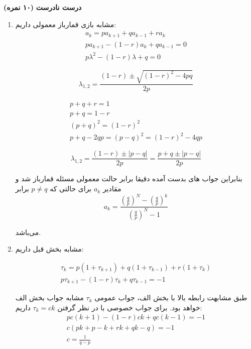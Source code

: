 \Large \textbf{درست نادرست}
\large \textbf{(۱۰ نمره)}

\normalsize \vspace{0.5cm}

\begin{enumerate}[label=(\alph*)]
	\item
	مشابه بازی قمارباز معمولی داریم:
	$$
	\begin{array}{c}
		{a_k} = p{a_{k + 1}} + q{a_{k - 1}} + r{a_k}\\
		p{a_{k + 1}} - \left( {1 - r} \right){a_k} + q{a_{k - 1}} = 0\\
		p{\lambda ^2} - \left( {1 - r} \right)\lambda  + q = 0
	\end{array}
	$$
	
	$$
	{\lambda _{1,2}} = \frac{{\left( {1 - r} \right) \pm \sqrt {{{\left( {1 - r} \right)}^2} - 4pq} }}{{2p}}
	$$
	
	$$
	\begin{array}{c}
		p + q + r = 1\\
		p + q = 1 - r\\
		{\left( {p + q} \right)^2} = {\left( {1 - r} \right)^2}\\
		p + q - 2qp = {\left( {p - q} \right)^2} = {\left( {1 - r} \right)^2} - 4qp
	\end{array}
	$$
	
	$$
	{\lambda _{1,2}} = \frac{{\left( {1 - r} \right) \pm \left| {p - q} \right|}}{{2p}} = \frac{{p + q \pm \left| {p - q} \right|}}{{2p}}
	$$
	
	بنابراین جواب های بدست آمده دقیقا برابر حالت معمولی مسئله قمارباز شد و مقادیر
	${a_k}$
	برای حالتی که
	$p \ne q$
	برابر
	$$
	{a_k} = \frac{{{{\left( {\frac{q}{p}} \right)}^N} - {{\left( {\frac{q}{p}} \right)}^k}}}{{{{\left( {\frac{q}{p}} \right)}^N} - 1}}
	$$
	
	می‌باشد.
	
	\item
	
	مشابه بخش قبل داریم:
	
	$$
	\begin{array}{c}
		{\tau _k} = p\left( {1 + {\tau _{k + 1}}} \right) + q\left( {1 + {\tau _{k - 1}}} \right) + r\left( {1 + {\tau _k}} \right)\\
		p{\tau _{k + 1}} - \left( {1 - r} \right){\tau _k} + q{\tau _{k - 1}} =  - 1
	\end{array}
	$$
	
	طبق مشابهت رابطه بالا با بخش الف،‌ جواب عمومی
	${\tau _k}$
	مشابه جواب بخش الف خواهد بود. برای جواب خصوصی با در نظر گرفتن
	${\tau _k} = ck$
	داریم:
	$$
	\begin{array}{c}
		pc\left( {k + 1} \right) - \left( {1 - r} \right)ck + qc\left( {k - 1} \right) =  - 1\\
		c\left( {pk + p - k + rk + qk - q} \right) =  - 1\\
		c = \frac{1}{{q - p}}
	\end{array}
	$$
	

\end{enumerate}
